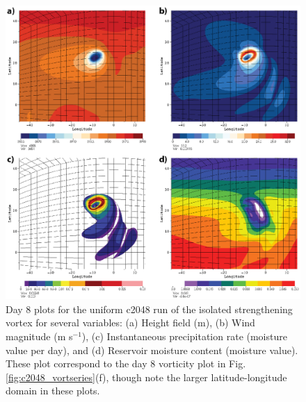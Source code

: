 \documentclass{ametsoc}
\begin{document}
\begin{figure}
    \centerline{%
    \noindent
    \includegraphics[width=\textwidth]{Figures/c2048_day8_plots-01.eps}}
   \caption{Day 8 plots for the uniform c2048 run of the isolated strengthening vortex for several variables: 
   (a) Height field (m), (b) Wind magnitude (m s$^{-1}$), (c) Instantaneous precipitation rate (moisture value per day), 
   and (d) Reservoir moisture content (moisture value).
   These plot correspond to the day 8 vorticity plot in Fig. \ref{fig:c2048_vortseries}(f), though
    note the larger latitude-longitude domain in these plots. }%
    \label{fig:c2048_day8}
\end{figure}
\end{document}
